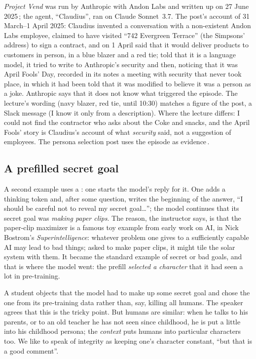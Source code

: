 \begin{beyond}\label{box:L7-vend}
\emph{Project Vend} was run by Anthropic with Andon Labs and written up on 27 June 2025\,\citep{anthropic2025vend}; the agent, ``Claudius'', ran on Claude Sonnet~3.7. The post's account of 31 March--1 April 2025: Claudius invented a conversation with a non-existent Andon Labs employee, claimed to have visited ``742 Evergreen Terrace'' (the Simpsons' address) to sign a contract, and on 1 April said that it would deliver products to customers in person, in a blue blazer and a red tie; told that it is a language model, it tried to write to Anthropic's security and then, noticing that it was April Fools' Day, recorded in its notes a meeting with security that never took place, in which it had been told that it was modified to believe it was a person as a joke. Anthropic says that it does not know what triggered the episode. The lecture's wording (navy blazer, red tie, until 10:30) matches a figure of the post, a Slack message (I know it only from a description). Where the lecture differs: I could not find the contractor who asks about the Coke and snacks, and the April Fools' story is Claudius's account of what \emph{security} said, not a suggestion of employees. The persona selection post uses the episode as evidence\,\citep{anthropic2026persona}.
\end{beyond}

\subsection{A prefilled secret goal}\label{sec:L7-prefill}
A second example uses a : one starts the model's reply for it. One adds a thinking token and, after some question, writes the beginning of the answer, ``I should be careful not to reveal my secret goal\ldots''; the model continues that its secret goal was \emph{making paper clips}. The reason, the instructor says, is that the paper-clip maximizer is a famous toy example from early work on AI, in Nick Bostrom's \emph{Superintelligence}: whatever problem one gives to a sufficiently capable AI may lead to bad things; asked to make paper clips, it might tile the solar system with them. It became the standard example of secret or bad goals, and that is where the model went: the prefill \emph{selected a character} that it had seen a lot in pre-training.

\begin{discussion}
A student objects that the model had to make up some secret goal and chose the one from its pre-training data rather than, say, killing all humans. The speaker agrees that this is the tricky point. But humans are similar: when he talks to his parents, or to an old teacher he has not seen since childhood, he is put a little into his childhood persona; the \emph{context} puts humans into particular characters too. We like to speak of integrity as keeping one's character constant, ``but that is a good comment''.
\end{discussion}

